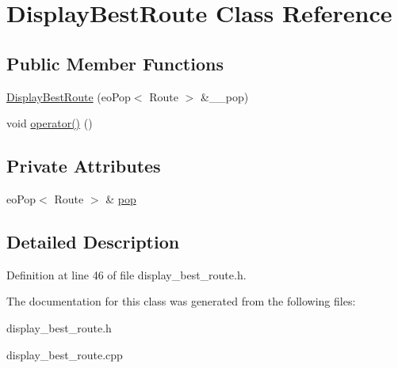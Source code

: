 \hypertarget{classDisplayBestRoute}{
\section{Display\-Best\-Route Class Reference}
\label{classDisplayBestRoute}
}
\subsection*{Public Member Functions}
\begin{CompactItemize}
\item 
\hypertarget{classDisplayBestRoute_db263e38f1e82174f811bf62f323f87f}{
\hyperlink{classDisplayBestRoute_db263e38f1e82174f811bf62f323f87f}{Display\-Best\-Route} (eo\-Pop$<$ Route $>$ \&\_\-\_\-pop)}
\label{classDisplayBestRoute_db263e38f1e82174f811bf62f323f87f}

\item 
\hypertarget{classDisplayBestRoute_ee879344a6d8b81a04d4eabbed2c7a04}{
void \hyperlink{classDisplayBestRoute_ee879344a6d8b81a04d4eabbed2c7a04}{operator()} ()}
\label{classDisplayBestRoute_ee879344a6d8b81a04d4eabbed2c7a04}

\end{CompactItemize}
\subsection*{Private Attributes}
\begin{CompactItemize}
\item 
\hypertarget{classDisplayBestRoute_5270aabbf294d2deca9878934216eb89}{
eo\-Pop$<$ Route $>$ \& \hyperlink{classDisplayBestRoute_5270aabbf294d2deca9878934216eb89}{pop}}
\label{classDisplayBestRoute_5270aabbf294d2deca9878934216eb89}

\end{CompactItemize}


\subsection{Detailed Description}




Definition at line 46 of file display\_\-best\_\-route.h.

The documentation for this class was generated from the following files:\begin{CompactItemize}
\item 
display\_\-best\_\-route.h\item 
display\_\-best\_\-route.cpp\end{CompactItemize}
